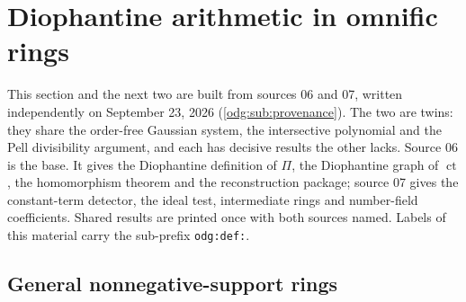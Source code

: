 \documentclass[11pt,oneside]{article}
\numberwithin{equation}{section}
\theoremstyle{definition}
\theoremstyle{remark}
\newcommand{\ct}{\operatorname{ct}}
\newcommand{\fn}[1]{\nolinkurl{#1}}
\begin{document}
\section{Diophantine arithmetic in omnific rings}\label{odg:def:sec:arithmetic}

This section and the next two are built from sources 06 and 07, written
independently on September 23, 2026 (\cref{odg:sub:provenance}). The two are
twins: they share the order-free Gaussian system, the intersective polynomial
and the Pell divisibility argument, and each has decisive results the other
lacks. Source 06 is the base. It gives the Diophantine definition of $\Pi$,
the Diophantine graph of $\ct$, the homomorphism theorem and the
reconstruction package; source 07 gives the constant-term detector, the ideal
test, intermediate rings and number-field coefficients. Shared results are
printed once with both sources named. Labels of this material carry the
sub-prefix \fn{odg:def:}.

\subsection{General nonnegative-support rings}\label{odg:def:sub:setting}
\end{document}
